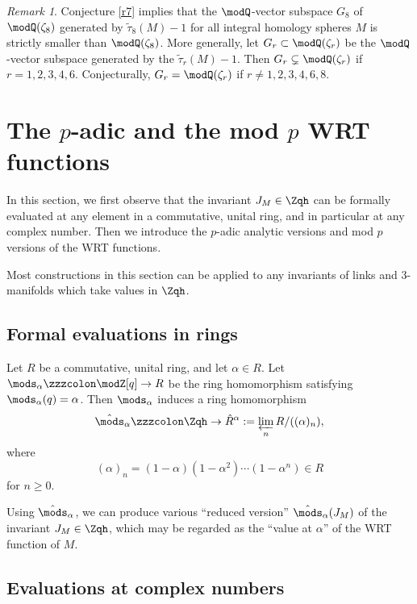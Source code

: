 \documentclass{amsart}
\numberwithin{equation}{section}
\numberwithin{figure}{section}
\theoremstyle{plain}
\theoremstyle{definition}
\theoremstyle{remark}
\newtheorem{remark}[theorem]{Remark}
\begin{document}
\begin{remark}
  \label{r13}
  Conjecture \ref{r7} implies that the $\modQ $-vector subspace $G_8$ of
  $\modQ (\zeta _8)$ generated by $\tilde\tau _8(M)-1$ for all integral homology
  spheres $M$ is strictly smaller than $\modQ (\zeta _8)$.  More generally,
  let $G_r\subset \modQ (\zeta _r)$ be the $\modQ $-vector subspace generated by the
  $\tilde\tau _r(M)-1$.  Then $G_r\subsetneq\modQ (\zeta _r)$ if $r=1,2,3,4,6$.
  Conjecturally, $G_r=\modQ (\zeta _r)$ if $r\neq 1,2,3,4,6,8$.
\end{remark}

\section{The $p$-adic and the mod $p$ WRT functions}
\label{sec13}

In this section, we first observe that the invariant $J_M\in \Zqh$ can
be formally evaluated at any element in a commutative, unital ring,
and in particular at any complex number.  Then we introduce the
$p$-adic analytic versions and mod $p$ versions of the
WRT functions.

Most constructions in this section can be applied to any invariants of
links and $3$-manifolds which take values in $\Zqh$.

\subsection{Formal evaluations in rings}
\label{sec:form-eval-rings}

Let $R$ be a commutative, unital ring, and let $\alpha \in R$.  Let
$\mods _\alpha \zzzcolon \modZ [q]\rightarrow R$ be the ring homomorphism satisfying $\mods _\alpha (q)=\alpha $.
Then $\mods _\alpha $ induces a ring homomorphism
\begin{equation*}
  \hat{\mods }_\alpha \zzzcolon \Zqh\rightarrow \hat{R}^\alpha :=\varprojlim_{n} R/((\alpha )_n),
\end{equation*}
where
\begin{equation*}
  (\alpha )_n = (1-\alpha )(1-\alpha ^2)\cdots(1-\alpha ^n)\in R
\end{equation*}
for $n\ge 0$.

Using $\hat{\mods }_\alpha $, we can produce various ``reduced version''
$\hat{\mods }_\alpha (J_M)$ of the invariant $J_M\in \Zqh$, which may be regarded
as the ``value at $\alpha $'' of the WRT function of $M$.

\subsection{Evaluations at complex numbers}
\label{sec:expans-at-compl}
\end{document}
